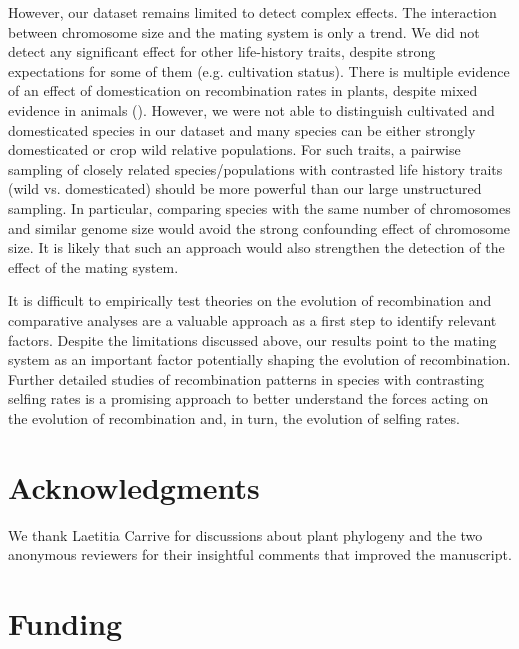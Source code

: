 \documentclass{article}
\begin{document}
However, our dataset remains limited to detect complex effects. The interaction between chromosome size and the mating system is only a trend. We did not detect any significant effect for other life-history traits, despite strong expectations for some of them (e.g. cultivation status). There is multiple evidence of an effect of domestication on recombination rates in plants, despite mixed evidence in animals (\cite{ross-ibarraGenomeSizeRecombination2007a,dreissigVariationRecombinationRate2019,fuentesDomesticationShapesRecombination2021,schreiberRecombinationLandscapeDivergence2022,munoz-fuentesStrongArtificialSelection2015}). However, we were not able to distinguish cultivated and domesticated species in our dataset and many species can be either strongly domesticated or crop wild relative populations. For such traits, a pairwise sampling of closely related species/populations with contrasted life history traits (wild vs. domesticated) should be more powerful than our large unstructured sampling. In particular, comparing species with the same number of chromosomes and similar genome size would avoid the strong confounding effect of chromosome size. It is likely that such an approach would also strengthen the detection of the effect of the mating system.


It is difficult to empirically test theories on the evolution of recombination and comparative analyses are a valuable approach as a first step to identify relevant factors. Despite the limitations discussed above, our results point to the mating system as an important factor potentially shaping the evolution of recombination. Further detailed studies of recombination patterns in species with contrasting selfing rates is a promising approach to better understand the forces acting on the evolution of recombination and, in turn, the evolution of selfing rates.




\section*{Acknowledgments}



We thank Laetitia Carrive for discussions about plant phylogeny and the two anonymous reviewers for their insightful comments that improved the manuscript.



\section*{Funding}
\end{document}
